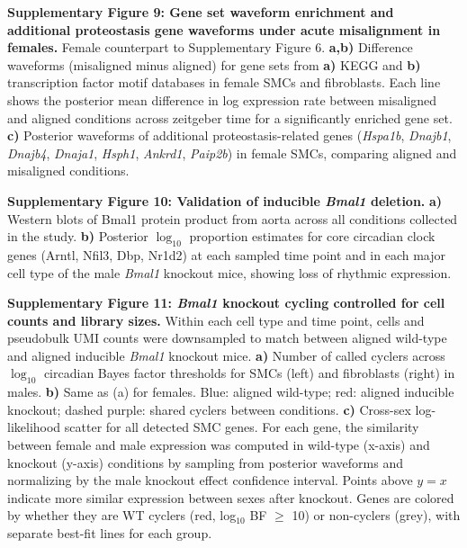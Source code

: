 \documentclass[12pt]{article}
\begin{document}
\bigskip

\textbf{Supplementary Figure 9: Gene set waveform enrichment and additional proteostasis gene
waveforms under acute misalignment in females.}
Female counterpart to Supplementary Figure 6.
\textbf{a,b)} Difference waveforms (misaligned minus aligned) for gene sets from \textbf{a)} KEGG and
\textbf{b)} transcription factor motif databases in female SMCs and fibroblasts. Each line shows the
posterior mean difference in log expression rate between misaligned and aligned conditions across
zeitgeber time for a significantly enriched gene set.
\textbf{c)} Posterior waveforms of additional proteostasis-related genes (\textit{Hspa1b},
\textit{Dnajb1}, \textit{Dnajb4}, \textit{Dnaja1}, \textit{Hsph1}, \textit{Ankrd1},
\textit{Paip2b}) in female SMCs, comparing aligned and misaligned conditions.

\bigskip

\textbf{Supplementary Figure 10: Validation of inducible \textit{Bmal1} deletion.}
\textbf{a)} Western blots of Bmal1 protein product from aorta across all conditions collected in the study.
\textbf{b)} Posterior $\log_{10}$ proportion estimates for core circadian clock genes (Arntl, Nfil3, Dbp, Nr1d2) at each sampled time point and in each major cell type of the male \textit{Bmal1} knockout mice, showing loss of rhythmic expression.

\bigskip

\textbf{Supplementary Figure 11: \textit{Bmal1} knockout cycling controlled for cell counts and library
sizes.}
Within each cell type and time point, cells and pseudobulk UMI counts were downsampled to match
between aligned wild-type and aligned inducible \textit{Bmal1} knockout mice.
\textbf{a)} Number of called cyclers across $\log_{10}$ circadian Bayes factor thresholds for SMCs
(left) and fibroblasts (right) in males.
\textbf{b)} Same as (a) for females. Blue: aligned wild-type; red: aligned inducible knockout;
dashed purple: shared cyclers between conditions.
\textbf{c)} Cross-sex log-likelihood scatter for all detected SMC genes. For each gene, the similarity between female and male expression was computed in wild-type (x-axis) and knockout (y-axis) conditions by sampling from posterior waveforms and normalizing by the male knockout effect confidence interval. Points above $y = x$ indicate more similar expression between sexes after knockout. Genes are colored by whether they are WT cyclers (red, log$_{10}$ BF $\geq$ 10) or non-cyclers (grey), with separate best-fit lines for each group.
\end{document}

